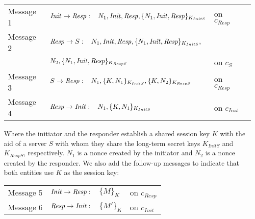 \documentclass[10pt,a4paper,final,oneside,fleqn]{book}
\begin{document}
\begin{tabular}{llll}
Message 1&\hspace{3mm}$\mbox{{\itshape Init\/}}\to\mbox{{\itshape Resp\/}}:\hspace{3mm}N_1,\mbox{{\itshape Init\/}},\mbox{{\itshape Resp\/}},\{N_1,\mbox{{\itshape Init\/}},\mbox{{\itshape Resp\/}}\}_{K_{InitS}}$&on $c_{Resp}$\\
Message 2&\hspace{3mm}$\mbox{{\itshape Resp\/}}\to S:\hspace{3mm}N_1, \mbox{{\itshape Init\/}},\mbox{{\itshape Resp\/}},\{N_1,\mbox{{\itshape Init\/}},\mbox{{\itshape Resp\/}}\}_{K_{InitS}},$\\
&\hspace{25mm}$N_2,\{N_1,\mbox{{\itshape Init\/}},\mbox{{\itshape Resp\/}}\}_{K_{RespS}}$&on $c_{S}$\\
Message 3&\hspace{3mm}$S\to \mbox{{\itshape Resp\/}}:\hspace{3mm}N_1,\{K,N_1\}_{K_{InitS}},\{K,N_2\}_{K_{RespS}}$&on $c_{Resp}$\\
Message 4&\hspace{3mm}$\mbox{{\itshape Resp\/}}\to\mbox{{\itshape Init\/}}:\hspace{3mm}N_1,\{K,N_1\}_{K_{InitS}}$&on $c_{Init}$
\end{tabular}\vspace{4mm}

\noindent
Where the initiator and the responder establish a shared session key $K$ with the aid of a server $S$ with whom they share the long-term secret keys $K_{InitS}$ and $K_{RespS}$, respectively.  $N_1$ is a nonce created by the initiator and $N_2$ is a nonce created by the responder.  We also add the follow-up messages to indicate that both entities use $K$ as the session key:\vspace{4mm}

\begin{tabular}{llll}
Message 5&\hspace{5mm}$\mbox{{\itshape Init\/}}\to\mbox{{\itshape Resp\/}}:$&$\{M\}_{K}$&on $c_{Resp}$\\
Message 6&\hspace{5mm}$\mbox{{\itshape Resp\/}}\to\mbox{{\itshape Init\/}}:$&$\{M'\}_{K}$&on $c_{Init}$
\end{tabular}\vspace{4mm}

\noindent
\end{document}
